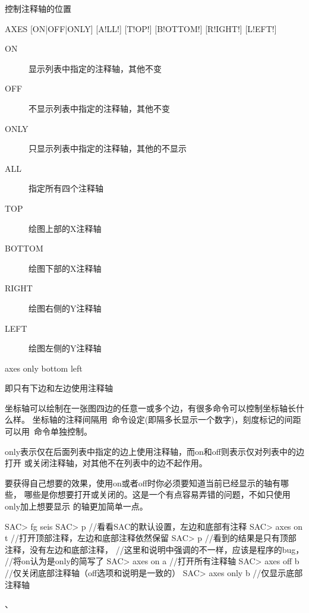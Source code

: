 \label{cmd:axes}

控制注释轴的位置

\begin{SACSTX}
AXES [ON|OFF|ONLY] [A!LL!] [T!OP!] [B!OTTOM!] [R!IGHT!] [L!EFT!]
\end{SACSTX}

\begin{description}
\item [ON] 显示列表中指定的注释轴，其他不变
\item [OFF] 不显示列表中指定的注释轴，其他不变
\item [ONLY] 只显示列表中指定的注释轴，其他的不显示
\item [ALL] 指定所有四个注释轴
\item [TOP] 绘图上部的X注释轴
\item [BOTTOM] 绘图下部的X注释轴
\item [RIGHT] 绘图右侧的Y注释轴
\item [LEFT] 绘图左侧的Y注释轴
\end{description}

\begin{SACDFT}
axes only bottom left
\end{SACDFT}
即只有下边和左边使用注释轴

坐标轴可以绘制在一张图四边的任意一或多个边，有很多命令可以控制坐标轴长什么样。
坐标轴的注释间隔用~命令设定(即隔多长显示一个数字)，刻度标记的间距可以用~命令单独控制。

only表示仅在后面列表中指定的边上使用注释轴，而on和off则表示仅对列表中的边打开
或关闭注释轴，对其他不在列表中的边不起作用。

要获得自己想要的效果，使用on或者off时你必须要知道当前已经显示的轴有哪些，
哪些是你想要打开或关闭的。这是一个有点容易弄错的问题，不如只使用only加上想要显示
的轴更加简单一点。

\begin{SACCode}
SAC> fg seis
SAC> p           //看看SAC的默认设置，左边和底部有注释
SAC> axes on t   //打开顶部注释，左边和底部注释依然保留
SAC> p           //看到的结果是只有顶部注释，没有左边和底部注释，
                 //这里和说明中强调的不一样，应该是程序的bug，
                 //将on认为是only的简写了
SAC> axes on a   //打开所有注释轴
SAC> axes off b  //仅关闭底部注释轴（off选项和说明是一致的）
SAC> axes only b //仅显示底部注释轴
\end{SACCode}

、
